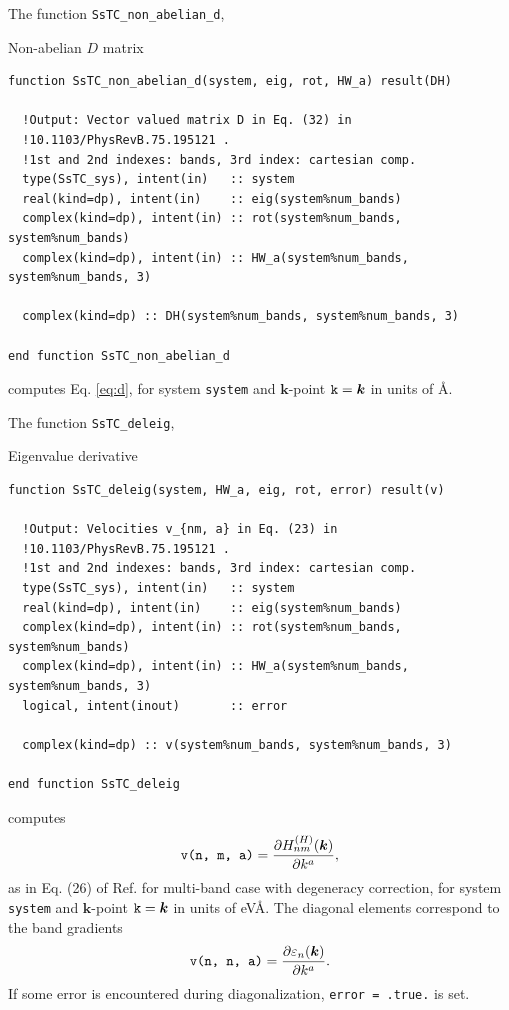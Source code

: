 \documentclass[10pt,a4paper]{article}
\begin{document}
The function \verb|SsTC_non_abelian_d|,
\begin{codebox}{Non-abelian $D$ matrix}
\begin{lstlisting}[caption={Interface of ``D matrix".},captionpos=b]
function SsTC_non_abelian_d(system, eig, rot, HW_a) result(DH)

  !Output: Vector valued matrix D in Eq. (32) in
  !10.1103/PhysRevB.75.195121 .
  !1st and 2nd indexes: bands, 3rd index: cartesian comp.
  type(SsTC_sys), intent(in)   :: system
  real(kind=dp), intent(in)    :: eig(system%num_bands)
  complex(kind=dp), intent(in) :: rot(system%num_bands, system%num_bands)
  complex(kind=dp), intent(in) :: HW_a(system%num_bands, system%num_bands, 3)

  complex(kind=dp) :: DH(system%num_bands, system%num_bands, 3)

end function SsTC_non_abelian_d
\end{lstlisting}
\end{codebox}
computes Eq. \eqref{eq:d}, for system \verb|system| and $\bm{k}$-point $\verb|k| = \bm{k}$ in units of \r{A}.

The function \verb|SsTC_deleig|,
\begin{codebox}{Eigenvalue derivative}
\begin{lstlisting}[caption={Interface of ``Derivative of eigenvalues".},captionpos=b]
function SsTC_deleig(system, HW_a, eig, rot, error) result(v)

  !Output: Velocities v_{nm, a} in Eq. (23) in
  !10.1103/PhysRevB.75.195121 .
  !1st and 2nd indexes: bands, 3rd index: cartesian comp.
  type(SsTC_sys), intent(in)   :: system
  real(kind=dp), intent(in)    :: eig(system%num_bands)
  complex(kind=dp), intent(in) :: rot(system%num_bands, system%num_bands)
  complex(kind=dp), intent(in) :: HW_a(system%num_bands, system%num_bands, 3)
  logical, intent(inout)       :: error

  complex(kind=dp) :: v(system%num_bands, system%num_bands, 3)

end function SsTC_deleig
\end{lstlisting}
\end{codebox}
computes
\begin{equation}
\verb|v(n, m, a)| = \frac{\partial H_{nm}^{(H)}(\bm{k})}{\partial k^a},
\end{equation}
as in Eq. (26) of Ref. \cite{yatesSpectralFermiSurface2007} for multi-band case with degeneracy correction, for system \verb|system| and $\bm{k}$-point $\verb|k| = \bm{k}$ in units of eV\r{A}. The diagonal elements correspond to the band gradients
\begin{equation}
\verb|v(n, n, a)| = \frac{\partial\varepsilon_n(\bm{k})}{\partial k^a}.
\end{equation}
If some error is encountered during diagonalization, \verb|error = .true.| is set.
\end{document}
